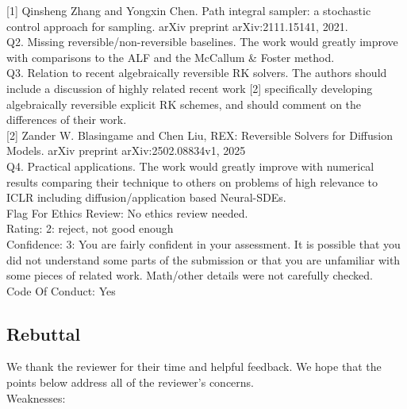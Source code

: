\documentclass{article}
\begin{document}
[1] Qinsheng Zhang and Yongxin Chen. Path integral sampler: a stochastic control approach for sampling. arXiv preprint arXiv:2111.15141, 2021.\\

Q2. Missing reversible/non-reversible baselines. The work would greatly improve with comparisons to the ALF and the McCallum \& Foster method.\\

Q3. Relation to recent algebraically reversible RK solvers. The authors should include a discussion of highly related recent work [2] specifically developing algebraically reversible explicit RK schemes, and should comment on the differences of their work.\\

[2] Zander W. Blasingame and Chen Liu, REX: Reversible Solvers for Diffusion Models. arXiv preprint arXiv:2502.08834v1, 2025\\

Q4. Practical applications. The work would greatly improve with numerical results comparing their technique to others on problems of high relevance to ICLR including diffusion/application based Neural-SDEs.\\

Flag For Ethics Review: No ethics review needed.\\
Rating: 2: reject, not good enough\\
Confidence: 3: You are fairly confident in your assessment. It is possible that you did not understand some parts of the submission or that you are unfamiliar with some pieces of related work. Math/other details were not carefully checked.\\
Code Of Conduct: Yes\\

\subsection{Rebuttal}

We thank the reviewer for their time and helpful feedback. We hope that the points below address all of the reviewer's concerns.\\

Weaknesses:\\
\end{document}
